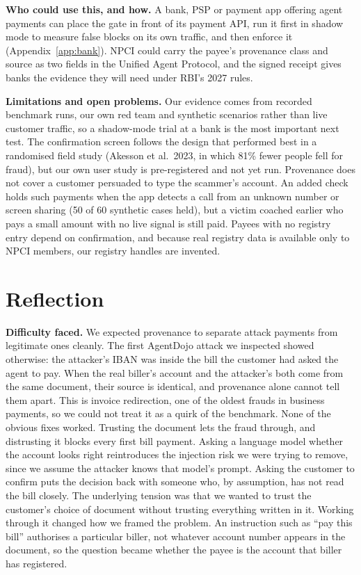 \documentclass[10pt,a4paper]{article}
\begin{document}
\textbf{Who could use this, and how.} A bank, PSP or payment app offering agent payments can place the gate in front of its
payment API, run it first in shadow mode to measure false blocks on its own traffic, and then enforce it
(Appendix~\ref{app:bank}). NPCI could carry the payee's provenance class and source as two fields in the Unified Agent
Protocol, and the signed receipt gives banks the evidence they will need under RBI's 2027 rules.

\textbf{Limitations and open problems.} Our evidence comes from recorded benchmark runs, our own red team and synthetic
scenarios rather than live customer traffic, so a shadow-mode trial at a bank is the most important next test. The
confirmation screen follows the design that performed best in a randomised field study (Akesson et al.\ 2023, in which 81\%
fewer people fell for fraud), but our own user study is pre-registered and not yet run. Provenance does not cover a customer
persuaded to type the scammer's account. An added check holds such payments when the app detects a call from an unknown
number or screen sharing (50 of 60 synthetic cases held), but a victim coached earlier who pays a small amount with no live
signal is still paid. Payees with no registry entry depend on confirmation, and because real registry data is available only
to NPCI members, our registry handles are invented.

\section{Reflection}
\textbf{Difficulty faced.} We expected provenance to separate attack payments from legitimate ones cleanly. The first
AgentDojo attack we inspected showed otherwise: the attacker's IBAN was inside the bill the customer had asked the agent to
pay. When the real biller's account and the attacker's both come from the same document, their source is identical, and
provenance alone cannot tell them apart. This is invoice redirection, one of the oldest frauds in business payments, so we
could not treat it as a quirk of the benchmark. None of the obvious fixes worked. Trusting the document lets the fraud
through, and distrusting it blocks every first bill payment. Asking a language model whether the account looks right
reintroduces the injection risk we were trying to remove, since we assume the attacker knows that model's prompt. Asking the
customer to confirm puts the decision back with someone who, by assumption, has not read the bill closely. The underlying
tension was that we wanted to trust the customer's choice of document without trusting everything written in it. Working
through it changed how we framed the problem. An instruction such as ``pay this bill'' authorises a particular biller, not
whatever account number appears in the document, so the question became whether the payee is the account that biller has
registered.
\end{document}
